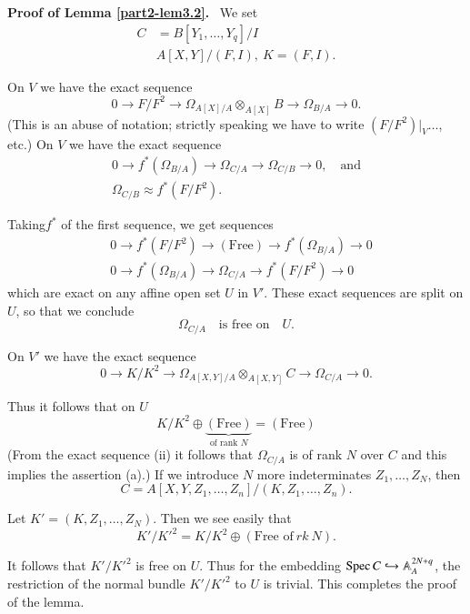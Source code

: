 \noindent
{\bf Proof of Lemma \ref{part2-lem3.2}.}~ We set
\begin{align*}
C &= B[Y_{1},\ldots,Y_{q}]/I\\
& A[X,Y]/(F,I),\ K=(F,I).
\end{align*}

On $V$ we have the exact sequence
\begin{equation*}
0\to F/F^{2}\to \Omega_{A[X]/A}\otimes_{A[X]}B\to \Omega_{B/A}\to
0.\tag{i} 
\end{equation*}
(This is an abuse of notation; strictly speaking we have to write\break
$(F/F^{2})|_{V}\ldots$, etc.) On $V$ we have the exact sequence
\begin{gather*}
0\to f^{*}(\Omega_{B/A})\to \Omega_{C/A}\to \Omega_{C/B}\to
0,\quad\text{and}\tag{ii}\\
\Omega_{C/B}\approx f^{*}(F/F^{2}).
\end{gather*}

Taking\pageoriginale $f^{*}$ of the first sequence, we get sequences 
\begin{align*}
& 0\to f^{\ast}(F/F^{2})\to (\text{Free})\to f^{\ast}(\Omega_{B/A})\to
  0\\
& 0\to f^{*}(\Omega_{B/A})\to \Omega_{C/A}\to f^{*}(F/F^{2})\to 0 
\end{align*}
which are exact on any affine open set $U$ in $V'$. These exact
sequences are split on $U$, so that we conclude
$$
\Omega_{C/A}\quad\text{is free on}\quad U.
$$

On $V'$ we have the exact sequence
$$
0\to K/K^{2}\to \Omega_{A[X,Y]/A}\otimes_{A[X,Y]}C\to \Omega_{C/A}\to
0.
$$

Thus it follows that on $U$
$$
K/K^{2}\oplus \underbrace{(\text{Free})}_{\text{of rank
    $N$}}=(\text{Free})
$$
(From the exact sequence (ii) it follows that $\Omega_{C/A}$ is of
rank $N$ over $C$ and this implies the assertion (a).) If we introduce
$N$ more indeterminates $Z_{1},\ldots,Z_{N}$, then
\begin{equation*}
C=A[X,Y,Z_{1},\ldots,Z_{n}]/(K,Z_{1},\ldots,Z_{n}).\tag{*}
\end{equation*}

Let $K'=(K,Z_{1},\ldots,Z_{N})$. Then we see easily that
$$
K'/{K'}^{2}=K/K^{2}\oplus (\text{Free of}~rk\ N).
$$

It follows that $K'/{K'}^{2}$ is free on $U$. Thus for the embedding\break
$\operatorname{Spec} C\hookrightarrow \mathbb{A}^{2N+q}_{A}$, the restriction of the
normal bundle $K'/{K'}^{2}$ to $U$ is trivial. This completes the
proof of the lemma.

